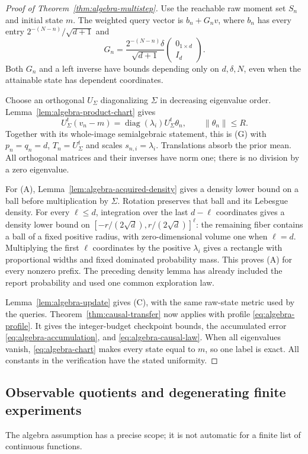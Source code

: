 \documentclass[11pt]{amsart}
\theoremstyle{definition}\newtheorem{definition}[theorem]{Definition}
\theoremstyle{remark}\newtheorem{remark}[theorem]{Remark}
\begin{document}
\begin{proof}[Proof of Theorem~\ref{thm:algebra-multistep}]
Use the reachable raw moment set $S_n$ and initial state $m$.
The weighted query vector is $b_n+G_nv$, where $b_n$ has every entry
$2^{-(N-n)}/\sqrt{d+1}$ and
\[
 G_n=\frac{2^{-(N-n)}\delta}{\sqrt{d+1}}
                           \begin{pmatrix}0_{1\times d}\\ I_d\end{pmatrix}.
\]
Both $G_n$ and a left inverse have bounds depending only on
$d,\delta,N$, even when the attainable state has dependent coordinates.

Choose an orthogonal $U_\Sigma$ diagonalizing $\Sigma$ in decreasing
eigenvalue order. Lemma~\ref{lem:algebra-product-chart} gives
\[
 U_\Sigma^t(v_n-m)=\operatorname{diag}(\lambda_i)U_\Sigma^t\theta_n,
             \qquad\|\theta_n\|\le R.
\]
Together with its whole-image semialgebraic statement, this is (G) with
$p_n=q_n=d$, $T_n=U_\Sigma^t$ and scales $s_{n,i}=\lambda_i$.
Translations absorb the prior mean. All orthogonal matrices and their
inverses have norm one; there is no division by a zero eigenvalue.

For (A), Lemma~\ref{lem:algebra-acquired-density} gives a density lower
bound on a ball before multiplication by $\Sigma$. Rotation preserves
that ball and its Lebesgue density. For every $\ell\le d$, integration
over the last $d-\ell$ coordinates gives a density lower bound on
$[-r/(2\sqrt d),r/(2\sqrt d)]^\ell$: the remaining fiber contains
a ball of a fixed positive radius, with zero-dimensional volume one
when $\ell=d$. Multiplying the first $\ell$ coordinates by the
positive $\lambda_i$ gives a rectangle with proportional widths and
fixed dominated probability mass. This proves (A) for every nonzero
prefix. The preceding density lemma has already included the report
probability and used one common exploration law.

Lemma~\ref{lem:algebra-update} gives (C), with the same raw-state
metric used by the queries. Theorem~\ref{thm:causal-transfer} now applies
with profile \eqref{eq:algebra-profile}. It gives the integer-budget
checkpoint bounds, the accumulated error \eqref{eq:algebra-accumulation},
and \eqref{eq:algebra-causal-law}. When all eigenvalues vanish,
\eqref{eq:algebra-chart} makes every state equal to $m$, so one label
is exact. All constants in the verification have the stated uniformity.
\end{proof}

\subsection{Observable quotients and degenerating finite experiments}
The algebra assumption has a precise scope; it is not automatic for a
finite list of continuous functions.
\end{document}
